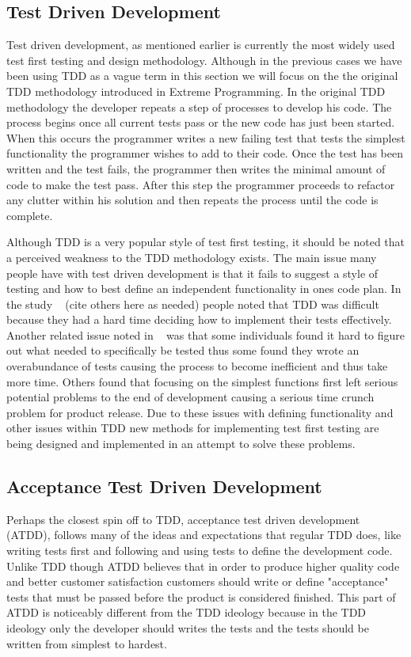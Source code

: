 \documentclass{sig-alternate}
\begin{document}
\subsection{Test Driven Development}
Test driven development, as mentioned earlier is currently the most widely used test first testing and design methodology.  Although in the previous cases we have been using TDD as a vague term in this section we will focus on the the original TDD methodology introduced in Extreme Programming.  In the original TDD methodology the developer repeats a step of processes to develop his code.  The process begins once all current tests pass or the new code has just been started.  When this occurs the programmer writes a new failing test that tests the simplest functionality the programmer wishes to add to their code.  Once the test has been written and the test fails, the programmer then writes the minimal amount of code to make the test pass.  After this step the programmer proceeds to refactor any clutter within his solution and then repeats the process until the code is complete.

Although TDD is a very popular style of test first testing, it should be noted that a perceived weakness to the TDD methodology exists.  The main issue many people have with test driven development is that it fails to suggest a style of testing and how to best define an independent functionality in ones code plan.  In the study ~\cite{Kettunen:2010} (cite others here as needed) people noted that TDD was difficult because they had a hard time deciding how to implement their tests effectively.  Another related issue noted in ~\cite{Kettunen:2010} was that some individuals found it hard to figure out what needed to specifically be tested thus some found they wrote an overabundance of tests causing the process to become inefficient and thus take more time.  Others found that focusing on the simplest functions first left serious potential problems to the end of development causing a serious time crunch problem for product release.  Due to these issues with defining functionality and other issues within TDD new methods for implementing test first testing are being designed and implemented in an attempt to solve these problems.
\subsection{Acceptance Test Driven Development}

Perhaps the closest spin off to TDD, acceptance test driven development (ATDD), follows many of the ideas and expectations that regular TDD does, like writing tests first and following and using tests to define the development code.  Unlike TDD though ATDD believes that in order to produce higher quality code and better customer satisfaction customers should write or define "acceptance" tests that must be passed before the product is considered finished.  This part of ATDD is noticeably different from the TDD ideology because in the TDD ideology only the developer should writes the tests and the tests should be written from simplest to hardest.~\cite{Hammond:2012}
\end{document}
